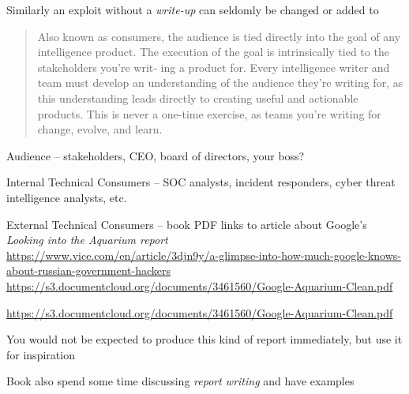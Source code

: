 \documentclass[Screen16to9,17pt]{foils}
\begin{document}
\begin{list2}
\item Similarly an exploit without a \emph{write-up} can seldomly be changed or added to
\end{list2}




\begin{quote}
Also known as consumers, the audience is tied directly into the goal of any intelligence
product. The execution of the goal is intrinsically tied to the stakeholders you’re writ‐
ing a product for. Every intelligence writer and team must develop an understanding
of the audience they’re writing for, as this understanding leads directly to creating
useful and actionable products. This is never a one-time exercise, as teams you’re
writing for change, evolve, and learn.
\end{quote}

\begin{list2}
\item Audience -- stakeholders, CEO, board of directors, your boss?
\item Internal Technical Consumers -- SOC analysts, incident responders,
cyber threat intelligence analysts, etc.
\item External Technical Consumers -- book PDF links to article about Google’s \emph{Looking into the Aquarium report}\\
\url{https://www.vice.com/en/article/3djn9y/a-glimpse-into-how-much-google-knows-about-russian-government-hackers}\\
\url{https://s3.documentcloud.org/documents/3461560/Google-Aquarium-Clean.pdf}
\end{list2}




\url{https://s3.documentcloud.org/documents/3461560/Google-Aquarium-Clean.pdf}

\begin{list2}
\item You would not be expected to produce this kind of report immediately, but use it for inspiration
\item Book also spend some time discussing \emph{report writing} and have examples
\end{list2}


\end{document}
